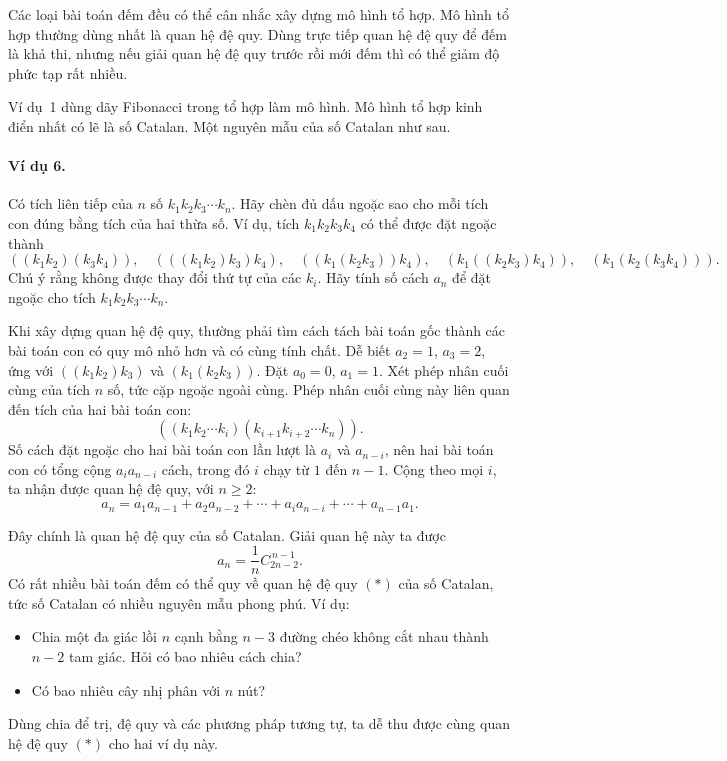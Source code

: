 \documentclass[11pt]{article}
\begin{document}
Các loại bài toán đếm đều có thể cân nhắc xây dựng mô hình tổ hợp. Mô hình tổ
hợp thường dùng nhất là quan hệ đệ quy. Dùng trực tiếp quan hệ đệ quy để đếm
là khả thi, nhưng nếu giải quan hệ đệ quy trước rồi mới đếm thì có thể giảm
độ phức tạp rất nhiều.

Ví dụ~1 dùng dãy Fibonacci trong tổ hợp làm mô hình. Mô hình tổ hợp kinh điển
nhất có lẽ là số Catalan. Một nguyên mẫu của số Catalan như sau.

\paragraph{Ví dụ 6.}
Có tích liên tiếp của \(n\) số \(k_1k_2k_3\cdots k_n\). Hãy chèn đủ dấu ngoặc
sao cho mỗi tích con đúng bằng tích của hai thừa số. Ví dụ, tích
\(k_1k_2k_3k_4\) có thể được đặt ngoặc thành
\[
((k_1k_2)(k_3k_4)),\quad (((k_1k_2)k_3)k_4),\quad
((k_1(k_2k_3))k_4),\quad (k_1((k_2k_3)k_4)),\quad
(k_1(k_2(k_3k_4))).
\]
Chú ý rằng không được thay đổi thứ tự của các \(k_i\). Hãy tính số cách
\(a_n\) để đặt ngoặc cho tích \(k_1k_2k_3\cdots k_n\).

Khi xây dựng quan hệ đệ quy, thường phải tìm cách tách bài toán gốc thành các
bài toán con có quy mô nhỏ hơn và có cùng tính chất. Dễ biết \(a_2=1\),
\(a_3=2\), ứng với \(((k_1k_2)k_3)\) và \((k_1(k_2k_3))\). Đặt \(a_0=0\),
\(a_1=1\). Xét phép nhân cuối cùng của tích \(n\) số, tức cặp ngoặc ngoài
cùng. Phép nhân cuối cùng này liên quan đến tích của hai bài toán con:
\[
  ((k_1k_2\cdots k_i)(k_{i+1}k_{i+2}\cdots k_n)).
\]
Số cách đặt ngoặc cho hai bài toán con lần lượt là \(a_i\) và \(a_{n-i}\), nên
hai bài toán con có tổng cộng \(a_i a_{n-i}\) cách, trong đó \(i\) chạy từ
\(1\) đến \(n-1\). Cộng theo mọi \(i\), ta nhận được quan hệ đệ quy, với
\(n\ge 2\):
\[
  a_n=a_1a_{n-1}+a_2a_{n-2}+\cdots+a_ia_{n-i}+\cdots+a_{n-1}a_1.
  \tag{*}
\]

Đây chính là quan hệ đệ quy của số Catalan. Giải quan hệ này ta được
\[
  a_n=\frac{1}{n}C_{2n-2}^{\,n-1}.
\]
Có rất nhiều bài toán đếm có thể quy về quan hệ đệ quy \((*)\) của số
Catalan, tức số Catalan có nhiều nguyên mẫu phong phú. Ví dụ:
\begin{itemize}
  \item {} Chia một đa giác lồi \(n\) cạnh bằng
  \(n-3\) đường chéo không cắt nhau thành \(n-2\) tam giác. Hỏi có bao nhiêu
  cách chia?
  \item {} Có bao nhiêu cây nhị phân với \(n\) nút?
\end{itemize}
Dùng chia để trị, đệ quy và các phương pháp tương tự, ta dễ thu được cùng quan
hệ đệ quy \((*)\) cho hai ví dụ này.
\end{document}
